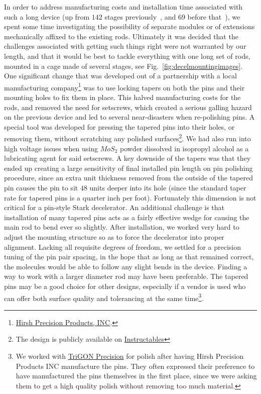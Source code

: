 In order to address manufacturing costs and installation time associated with such a long device (up from $142$ stages previously~\cite{Sawyer2007}, and $69$ before that~\cite{Bochinski2004}), we spent some time investigating the possibility of separate modules or of extensions mechanically affixed to the existing rods.
Ultimately it was decided that the challenges associated with getting such things right were not warranted by our length, and that it would be best to tackle everything with one long set of rods, mounted in a cage made of several stages, see Fig.~\ref{fig:decelmountingimages}.
One significant change that was developed out of a partnership with a local manufacturing company\footnote{\href{https://hirshprecisionproductsinc.com}{Hirsh Precision Products, INC}.} was to use locking tapers on both the pins and their mounting holes to fix them in place.
This halved manufacturing costs for the rods, and removed the need for setscrews, which created a serious galling hazard on the previous device and led to several near-disasters when re-polishing pins.
A special tool was developed for pressing the tapered pins into their holes, or removing them, without scratching any polished surfaces\footnote{The design is publicly available on \href{https://www.instructables.com/id/Scratch-Free-Press-Tool/}{Instructables}}.
We had also run into high voltage issues when using $MoS_2$ powder dissolved in isopropyl alcohol as a lubricating agent for said setscrews.
A key downside of the tapers was that they ended up creating a large sensitivity of final installed pin length on pin polishing procedure, since an extra unit thickness removed from the outside of the tapered pin causes the pin to sit $48$ units deeper into its hole (since the standard taper rate for tapered pins is a quarter inch per foot).
Fortunately this dimension is not critical for a pin-style Stark decelerator.
An additional challenge is that installation of many tapered pins acts as a fairly effective wedge for causing the main rod to bend ever so slightly.
After installation, we worked very hard to adjust the mounting structure so as to force the decelerator into proper alignment.
Lacking all requisite degrees of freedom, we settled for a precision tuning of the pin pair spacing, in the hope that as long as that remained correct, the molecules would be able to follow any slight bends in the device.
Finding a way to work with a larger diameter rod may have been preferable.
The tapered pins may be a good choice for other designs, especially if a vendor is used who can offer both surface quality and tolerancing at the same time\footnote{We worked with \href{http://www.tri-gon.com}{TriGON Precision} for polish after having Hirsh Precision Products INC manufacture the pins. They often expressed their preference to have manufactured the pins themselves in the first place, since we were asking them to get a high quality polish without removing too much material.}.


